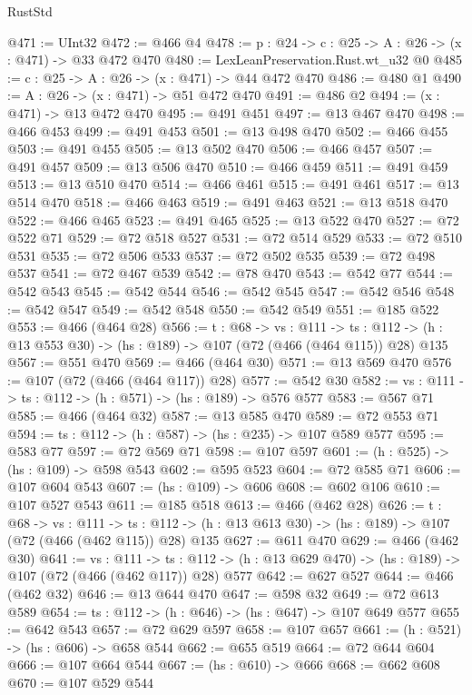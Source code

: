 \begin{lexlean}{RustStd}
\begin{coremodule}
{\begin{coremodule}
{{{{@471 := UInt32
@472 := @466 @4
@478 := {p : @24} -> {c : @25} -> {A : @26} -> (x : @471) -> @33 @472 @470
@480 := LexLeanPreservation.Rust.wt_u32 @0
@485 := {c : @25} -> {A : @26} -> (x : @471) -> @44 @472 @470
@486 := @480 @1
@490 := {A : @26} -> (x : @471) -> @51 @472 @470
@491 := @486 @2
@494 := (x : @471) -> @13 @472 @470
@495 := @491 @451
@497 := @13 @467 @470
@498 := @466 @453
@499 := @491 @453
@501 := @13 @498 @470
@502 := @466 @455
@503 := @491 @455
@505 := @13 @502 @470
@506 := @466 @457
@507 := @491 @457
@509 := @13 @506 @470
@510 := @466 @459
@511 := @491 @459
@513 := @13 @510 @470
@514 := @466 @461
@515 := @491 @461
@517 := @13 @514 @470
@518 := @466 @463
@519 := @491 @463
@521 := @13 @518 @470
@522 := @466 @465
@523 := @491 @465
@525 := @13 @522 @470
@527 := @72 @522 @71
@529 := @72 @518 @527
@531 := @72 @514 @529
@533 := @72 @510 @531
@535 := @72 @506 @533
@537 := @72 @502 @535
@539 := @72 @498 @537
@541 := @72 @467 @539
@542 := @78 @470
@543 := @542 @77
@544 := @542 @543
@545 := @542 @544
@546 := @542 @545
@547 := @542 @546
@548 := @542 @547
@549 := @542 @548
@550 := @542 @549
@551 := @185 @522
@553 := @466 (@464 @28)
@566 := {t : @68} ->
  {vs : @111} ->
  {ts : @112} -> (h : @13 @553 @30) -> (hs : @189) -> @107 (@72 (@466 (@464 @115)) @28) @135
@567 := @551 @470
@569 := @466 (@464 @30)
@571 := @13 @569 @470
@576 := @107 (@72 (@466 (@464 @117)) @28)
@577 := @542 @30
@582 := {vs : @111} -> {ts : @112} -> (h : @571) -> (hs : @189) -> @576 @577
@583 := @567 @71
@585 := @466 (@464 @32)
@587 := @13 @585 @470
@589 := @72 @553 @71
@594 := {ts : @112} -> (h : @587) -> (hs : @235) -> @107 @589 @577
@595 := @583 @77
@597 := @72 @569 @71
@598 := @107 @597
@601 := (h : @525) -> (hs : @109) -> @598 @543
@602 := @595 @523
@604 := @72 @585 @71
@606 := @107 @604 @543
@607 := (hs : @109) -> @606
@608 := @602 @106
@610 := @107 @527 @543
@611 := @185 @518
@613 := @466 (@462 @28)
@626 := {t : @68} ->
  {vs : @111} ->
  {ts : @112} -> (h : @13 @613 @30) -> (hs : @189) -> @107 (@72 (@466 (@462 @115)) @28) @135
@627 := @611 @470
@629 := @466 (@462 @30)
@641 := {vs : @111} ->
  {ts : @112} -> (h : @13 @629 @470) -> (hs : @189) -> @107 (@72 (@466 (@462 @117)) @28) @577
@642 := @627 @527
@644 := @466 (@462 @32)
@646 := @13 @644 @470
@647 := @598 @32
@649 := @72 @613 @589
@654 := {ts : @112} -> (h : @646) -> (hs : @647) -> @107 @649 @577
@655 := @642 @543
@657 := @72 @629 @597
@658 := @107 @657
@661 := (h : @521) -> (hs : @606) -> @658 @544
@662 := @655 @519
@664 := @72 @644 @604
@666 := @107 @664 @544
@667 := (hs : @610) -> @666
@668 := @662 @608
@670 := @107 @529 @544
}}}}
\end{coremodule}}
\end{coremodule}
\end{lexlean}
